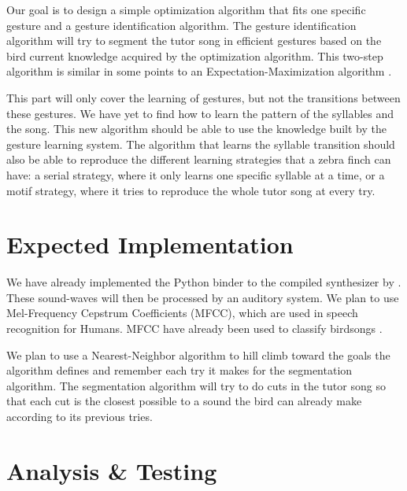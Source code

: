 \documentclass[a4paper]{article}
\begin{document}
\begin{multicols}{2}
Our goal is to design a simple optimization algorithm that fits one specific
gesture and a gesture identification algorithm. The gesture identification
algorithm will try to segment the tutor song in efficient gestures based on the
bird current knowledge acquired by the optimization algorithm. This two-step
algorithm is similar in some points to an Expectation-Maximization algorithm
\parencite{dempster_maximum_1977}.

This part will only cover the learning of gestures, but not the transitions
between these gestures. We have yet to find how to learn the pattern of the
syllables and the song. This new algorithm should be able to use the knowledge
built by the gesture learning system. The algorithm that learns the syllable
transition should also be able to reproduce the different learning strategies
that a zebra finch can have: a serial strategy, where it only learns one
specific syllable at a time, or a motif strategy, where it tries to reproduce
the whole tutor song at every try.


\section*{Expected Implementation}

We have already implemented the Python binder to the compiled synthesizer by
\textcite{boari_automatic_2015}. These sound-waves will then be processed by an
auditory system. We plan to use Mel-Frequency Cepstrum Coefficients (MFCC),
which are used in speech recognition for Humans. MFCC have already been used to
classify birdsongs \parencite{chou_studies_2008}.

We plan to use a Nearest-Neighbor algorithm to hill climb toward the goals the
algorithm defines and remember each try it makes for the segmentation algorithm.
The segmentation algorithm will try to do cuts in the tutor song so that each
cut is the closest possible to a sound the bird can already make according to
its previous tries.

\section*{Analysis \& Testing}


\end{multicols}
\end{document}
